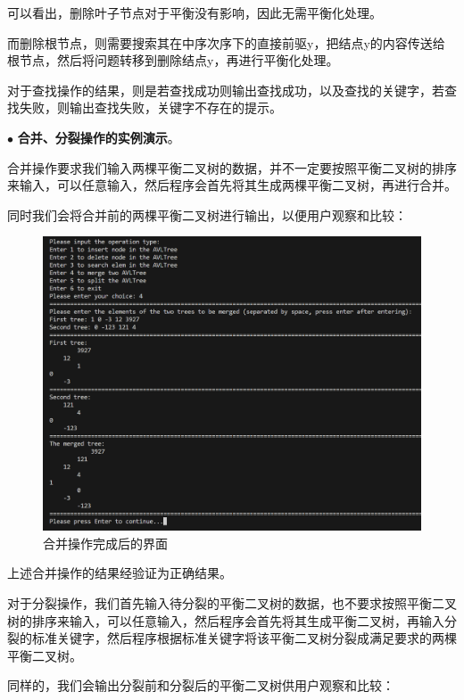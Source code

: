 可以看出，删除叶子节点对于平衡没有影响，因此无需平衡化处理。

而删除根节点，则需要搜索其在中序次序下的直接前驱y，把结点y的内容传送给根节点，然后将问题转移到删除结点y，再进行平衡化处理。

对于查找操作的结果，则是若查找成功则输出查找成功，以及查找的关键字，若查找失败，则输出查找失败，关键字不存在的提示。

\vspace{1ex}

\noindent
$\bullet$
\textbf{合并、分裂操作的实例演示}。

合并操作要求我们输入两棵平衡二叉树的数据，并不一定要按照平衡二叉树的排序来输入，可以任意输入，然后程序会首先将其生成两棵平衡二叉树，再进行合并。

同时我们会将合并前的两棵平衡二叉树进行输出，以便用户观察和比较：

\begin{figure}[H]
  \centering
  \includegraphics[width=15cm]{fig/AVLTree30.png}
  \caption{合并操作完成后的界面}
\end{figure}

上述合并操作的结果经验证为正确结果。

对于分裂操作，我们首先输入待分裂的平衡二叉树的数据，也不要求按照平衡二叉树的排序来输入，可以任意输入，然后程序会首先将其生成平衡二叉树，再输入分裂的标准关键字，然后程序根据标准关键字将该平衡二叉树分裂成满足要求的两棵平衡二叉树。

同样的，我们会输出分裂前和分裂后的平衡二叉树供用户观察和比较：

